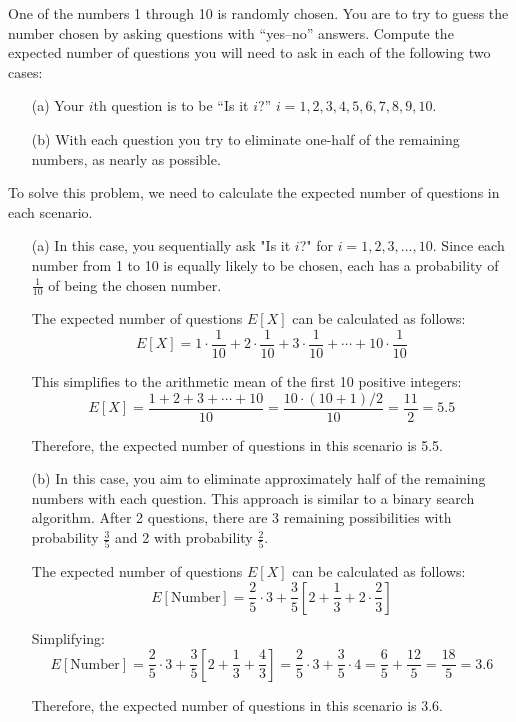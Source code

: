 \begin{exercise}
One of the numbers 1 through 10 is randomly chosen. You are to try to guess the number chosen by asking questions with “yes–no” answers. Compute the expected number of questions you will need to ask in each of the following two cases:
\begin{enumerate}
    \item[(a)] Your \(i\)th question is to be “Is it \(i\)?” \(i = 1, 2, 3, 4, 5, 6, 7, 8, 9, 10\).
    \item[(b)] With each question you try to eliminate one-half of the remaining numbers, as nearly as possible.
\end{enumerate}
\end{exercise}

\begin{solution}
To solve this problem, we need to calculate the expected number of questions in each scenario.

\begin{enumerate}
    \item[(a)] In this case, you sequentially ask "Is it \(i\)?" for \(i = 1, 2, 3, \ldots, 10\). Since each number from 1 to 10 is equally likely to be chosen, each has a probability of \(\frac{1}{10}\) of being the chosen number.

    The expected number of questions \(E[X]\) can be calculated as follows:
    \[
    E[X] = 1 \cdot \frac{1}{10} + 2 \cdot \frac{1}{10} + 3 \cdot \frac{1}{10} + \cdots + 10 \cdot \frac{1}{10}
    \]
    
    This simplifies to the arithmetic mean of the first 10 positive integers:
    \[
    E[X] = \frac{1 + 2 + 3 + \cdots + 10}{10} = \frac{10 \cdot (10 + 1) / 2}{10} = \frac{11}{2} = 5.5
    \]
    
    Therefore, the expected number of questions in this scenario is 5.5.
    
    \item[(b)] In this case, you aim to eliminate approximately half of the remaining numbers with each question. This approach is similar to a binary search algorithm. After 2 questions, there are 3 remaining possibilities with probability \(\frac{3}{5}\) and 2 with probability \(\frac{2}{5}\).

    The expected number of questions \(E[X]\) can be calculated as follows:
    \[
    E[\text{Number}] = \frac{2}{5} \cdot 3 + \frac{3}{5} \left[2 + \frac{1}{3} + 2 \cdot \frac{2}{3}\right]
    \]
    
    Simplifying:
    \[
    E[\text{Number}] = \frac{2}{5} \cdot 3 + \frac{3}{5} \left[2 + \frac{1}{3} + \frac{4}{3}\right] = \frac{2}{5} \cdot 3 + \frac{3}{5} \cdot 4 = \frac{6}{5} + \frac{12}{5} = \frac{18}{5} = 3.6
    \]

    Therefore, the expected number of questions in this scenario is 3.6.
\end{enumerate}
\end{solution}

